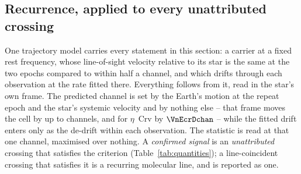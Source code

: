 \subsection{Recurrence, applied to every unattributed crossing}
\label{sec:etacrv}

One trajectory model carries every statement in this section: a carrier at a
fixed rest frequency, whose line-of-sight velocity relative to its star is the
same at the two epochs compared to within half a channel, and which drifts
through each observation at the rate fitted there. Everything follows from it,
read in the star's own frame. The predicted channel is set by the Earth's
motion at the repeat epoch and the star's systemic velocity and by nothing
else -- that frame moves the cell by up to \ZtFrameChanMax{} channels, and
for $\eta$~Crv by $\VnEcrDchan$ -- while the fitted drift enters only as the
de-drift within each observation. The statistic is read at that one channel,
maximised over nothing. A
\emph{confirmed signal} is an \emph{unattributed} crossing that satisfies the
criterion (Table~\ref{tab:quantities}); a line-coincident crossing that
satisfies it is a recurring molecular line, and is reported as one.


